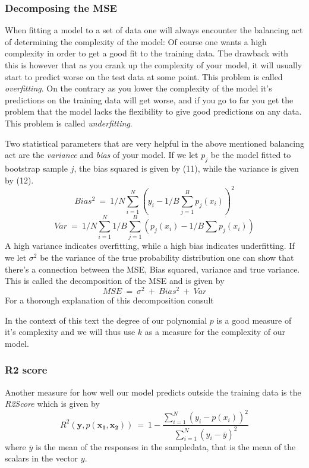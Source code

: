 \documentclass[a4paper,norsk]{article}
\begin{document}
\subsubsection{Decomposing the MSE}
When fitting a model to a set of data one will always encounter 
the balancing act of determining the complexity of the model: Of course
one wants a high complexity in order to get a good fit to the 
training data. The drawback with this is however that as you crank
up the complexity of your model, it will usually
start to predict worse on the test data at some point. 
This problem is called \textit{overfitting}. 
On the contrary as you lower the complexity of the model it's predictions
on the training data will get worse, and if you go to far you get the 
problem that the model lacks the flexibility to give good predictions on 
any data. This problem is called \textit{underfitting}.
\par
Two statistical parameters that are very helpful in the above mentioned 
balancing act are the \textit{variance} and \textit{bias} of your model. 
If we let $p_j$ be the model fitted to bootstrap sample $j$, 
the bias squared is given by (11), while the variance is given by (12).
\begin{equation}
    Bias^2 \ = \ 1/N \sum_{i=1}^N (y_i - 1/B \sum_{j=1}^B p_j(x_i))^2
\end{equation}
\begin{equation}
    Var \ = \ 1/N \sum_{i=1}^N 1/B \sum_{j=1}^B (p_j(x_i) 
    - 1/B \sum p_j(x_i))
\end{equation}
A high variance indicates overfitting, while a high bias indicates
underfitting. If we let $\sigma^2$ be the variance of the true probability
distribution one can show that there's a connection between the MSE,
Bias squared, variance and true variance. This is called the decomposition
of the MSE and is given by
\begin{equation}
    MSE \ = \ \sigma^2 \ + \ Bias^2 \ + \ Var
\end{equation}
For a thorough explanation of this decomposition consult \cite{MSEdecomposition}
\par
In the context of this text the degree of our polynomial $p$ 
is a good measure of it's complexity and we will thus use 
$k$ as a measure for the complexity of our model.

\subsubsection{R2 score}
Another measure for how well our model predicts outside the training data 
is the \textit{R2Score} which is given by
\begin{equation}
    R^2(\bm{y}, {p(\bm{x_1}, \bm{x_2})}) \ = \
    1 - 
    \frac{\sum_{i=1}^N(y_i-p(x_i))^2}{\sum_{i=1}^N(y_i-\overline{y})^2}
\end{equation}
where $\overline{y}$ is the mean of the responses in the sampledata, that 
is the mean of the scalars in the vector $\bm{}y$.
\end{document}
